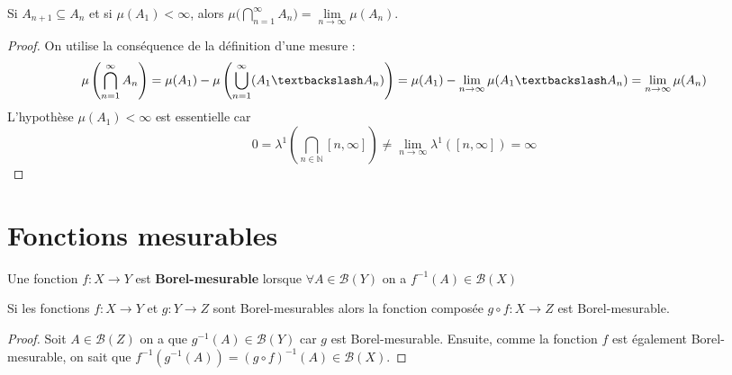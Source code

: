 \begin{theo}
    Si $A_{n+1}\subseteq A_{n}$ et si $\mu(A_1)<\infty$, alors $\mu\bigg(\bigcap\limits_{n=1}^\infty A_n\bigg)=\lim\limits_{n\to\infty}\mu(A_n)$.
\end{theo}
\begin{proof}
On utilise la conséquence de la définition d'une mesure :
    \begin{equation*}
        \mu\left(\bigcap_{n=1}^\infty A_n\right) = \mu(A_1)-\mu\left(\bigcup_{n=1}^\infty(A_1\textbackslash A_n)\right) = \mu(A_1)-\lim_{n\to\infty}\mu(A_1\textbackslash A_n)=\lim_{n\to\infty}\mu(A_n)
    \end{equation*}
    L'hypothèse $\mu(A_1)<\infty$ est essentielle car
    \begin{equation*}
        0=\lambda^1\left(\bigcap_{n\in\mathbb{N}}[n,\infty]\right) \neq \lim_{n\to\infty}\lambda^1([n,\infty])=\infty
    \end{equation*}
\end{proof}


\section{Fonctions mesurables}
\begin{definition}
    Une fonction $f:X\to Y$ est \textbf{Borel-mesurable} lorsque $\forall A\in\mathscr{B}(Y)$ on a $f^{-1}(A)\in\mathscr{B}(X)$
\end{definition}

\begin{theo}
    Si les fonctions $f:X\to Y$ et $g:Y\to Z$ sont Borel-mesurables alors la fonction composée $g\circ f:X\to Z$ est Borel-mesurable.
\end{theo}
\begin{proof}
    Soit $A\in \mathscr{B}(Z)$ on a que $g^{-1}(A)\in\mathscr{B}(Y)$ car $g$ est Borel-mesurable. Ensuite, comme la fonction $f$ est également Borel-mesurable, on sait que $f^{-1}\left(g^{-1}(A)\right)=(g\circ f)^{-1}(A)\in\mathscr{B}(X)$. 
\end{proof}

